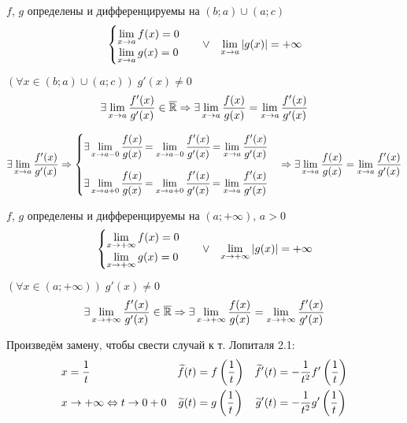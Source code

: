 \documentclass{article}
\begin{document}
\theorem[Лопиталя 2.3]

$f$, $g$ определены и дифференцируемы на $(b;a)\cup(a;c)$
\begin{align*}
	\begin{cases}
		\lim\limits_{x\to a}f(x)=0 \\
		\lim\limits_{x\to a}g(x)=0
	\end{cases} &  & \lor &  & \lim\limits_{x\to a}|g(x)|=+\infty
\end{align*}

$(\forall x\in(b;a)\cup(a;c))\;g'(x)\neq 0$
\begin{align*}
	\exists \lim\limits_{x\to a}\frac{f'(x)}{g'(x)}\in\overline{\mathbb{R}}\Rightarrow\exists\lim\limits_{x\to a}\frac{f(x)}{g(x)}=\lim\limits_{x\to a}\frac{f'(x)}{g'(x)}
\end{align*}

\proof
\begin{align*}
	\exists\lim\limits_{x\to a}\frac{f'(x)}{g'(x)}\Rightarrow
	\begin{cases}
		\exists\lim\limits_{x\to a-0}\cfrac{f(x)}{g(x)}=\lim\limits_{x\to a-0}\cfrac{f'(x)}{g'(x)}=\lim\limits_{x\to a}\cfrac{f'(x)}{g'(x)} \\[1.5em]
		\exists\lim\limits_{x\to a+0}\cfrac{f(x)}{g(x)}=\lim\limits_{x\to a+0}\cfrac{f'(x)}{g'(x)}=\lim\limits_{x\to a}\cfrac{f'(x)}{g'(x)}
	\end{cases}\Rightarrow\exists\lim\limits_{x\to a}\frac{f(x)}{g(x)}=\lim\limits_{x\to a}\frac{f'(x)}{g'(x)}
\end{align*}

\pagebreak

\theorem[Лопиталя 3.1]

$f$, $g$ определены и дифференцируемы на $(a;+\infty)$, $a>0$
\begin{align*}
	\begin{cases}
		\lim\limits_{x\to +\infty}f(x)=0 \\
		\lim\limits_{x\to +\infty}g(x)=0
	\end{cases} &  & \lor &  & \lim\limits_{x\to +\infty}|g(x)|=+\infty
\end{align*}

$(\forall x\in(a;+\infty))\;g'(x)\neq 0$
\begin{align*}
	\exists \lim\limits_{x\to +\infty}\frac{f'(x)}{g'(x)}\in\overline{\mathbb{R}}\Rightarrow\exists\lim\limits_{x\to +\infty}\frac{f(x)}{g(x)}=\lim\limits_{x\to +\infty}\frac{f'(x)}{g'(x)}
\end{align*}

\proof

Произведём замену, чтобы свести случай к т. Лопиталя 2.1:
\begin{align*}
	 & x=\frac{1}{t}               & \widetilde{f}(t) & =f\left(\frac{1}{t}\right) & \widetilde{f}'(t) & =-\frac{1}{t^{2}}f'\left(\frac{1}{t}\right) \\
	 & x\to +\infty\Leftrightarrow t\to 0+0 & \widetilde{g}(t) & =g\left(\frac{1}{t}\right) & \widetilde{g}'(t) & =-\frac{1}{t^{2}}g'\left(\frac{1}{t}\right)
\end{align*}
\end{document}

